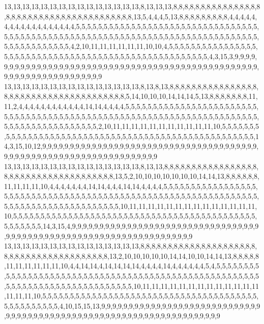 13,13,13,13,13,13,13,13,13,13,13,13,13,13,13,8,13,13,13,8,8,8,8,8,8,8,8,8,8,8,8,8,8,8,8,8,8,8,8,8,8,8,8,8,8,8,8,8,8,8,8,8,8,8,8,8,8,8,13,5,4,4,4,5,13,8,8,8,8,8,8,8,8,8,4,4,4,4,4,4,4,4,4,4,4,4,4,4,4,4,4,4,5,5,5,5,5,5,5,5,5,5,5,5,5,5,5,5,5,5,5,5,5,5,5,5,5,5,5,5,5,5,5,5,5,5,5,5,5,5,5,5,5,5,5,5,5,5,5,5,5,5,5,5,5,5,5,5,5,5,5,5,5,5,5,5,5,5,5,5,5,5,5,5,5,5,5,5,5,5,5,5,5,5,5,5,5,5,5,5,5,5,5,4,2,10,11,11,11,11,11,11,10,10,4,5,5,5,5,5,5,5,5,5,5,5,5,5,5,5,5,5,5,5,5,5,5,5,5,5,5,5,5,5,5,5,5,5,5,5,5,5,5,5,5,5,5,5,5,5,5,5,5,5,5,5,5,5,4,3,15,3,9,9,9,9,9,9,9,9,9,9,9,9,9,9,9,9,9,9,9,9,9,9,9,9,9,9,9,9,9,9,9,9,9,9,9,9,9,9,9,9,9,9,9,9,9,9,9,9,9,9,9,9,9,9,9,9,9,9,9,9,9,9,9,9,9,9,9,9
13,13,13,13,13,13,13,13,13,13,13,13,13,13,13,8,13,8,13,8,8,8,8,8,8,8,8,8,8,8,8,8,8,8,8,8,8,8,8,8,8,8,8,8,8,8,8,8,8,8,8,8,8,8,8,8,8,5,14,10,10,10,14,14,14,5,13,8,8,8,8,8,8,8,11,11,2,4,4,4,4,4,4,4,4,4,4,4,4,14,14,4,4,4,4,5,5,5,5,5,5,5,5,5,5,5,5,5,5,5,5,5,5,5,5,5,5,5,5,5,5,5,5,5,5,5,5,5,5,5,5,5,5,5,5,5,5,5,5,5,5,5,5,5,5,5,5,5,5,5,5,5,5,5,5,5,5,5,5,5,5,5,5,5,5,5,5,5,5,5,5,5,5,5,5,5,5,5,5,5,5,5,2,10,11,11,11,11,11,11,11,11,11,11,11,10,5,5,5,5,5,5,5,5,5,5,5,5,5,5,5,5,5,5,5,5,5,5,5,5,5,5,5,5,5,5,5,5,5,5,5,5,5,5,5,5,5,5,5,5,5,5,5,5,5,5,5,5,14,3,15,10,12,9,9,9,9,9,9,9,9,9,9,9,9,9,9,9,9,9,9,9,9,9,9,9,9,9,9,9,9,9,9,9,9,9,9,9,9,9,9,9,9,9,9,9,9,9,9,9,9,9,9,9,9,9,9,9,9,9,9,9,9,9,9,9,9,9,9,9
13,13,13,13,13,13,13,13,13,13,13,13,13,13,13,8,13,13,8,8,8,8,8,8,8,8,8,8,8,8,8,8,8,8,8,8,8,8,8,8,8,8,8,8,8,8,8,8,8,8,8,8,8,8,8,13,5,2,10,10,10,10,10,10,10,14,14,13,8,8,8,8,8,8,11,11,11,11,10,4,4,4,4,4,4,4,14,14,4,4,4,14,14,4,4,4,4,5,5,5,5,5,5,5,5,5,5,5,5,5,5,5,5,5,5,5,5,5,5,5,5,5,5,5,5,5,5,5,5,5,5,5,5,5,5,5,5,5,5,5,5,5,5,5,5,5,5,5,5,5,5,5,5,5,5,5,5,5,5,5,5,5,5,5,5,5,5,5,5,5,5,5,5,5,5,5,5,5,5,5,5,10,11,11,11,11,11,11,11,11,11,11,11,11,11,11,10,5,5,5,5,5,5,5,5,5,5,5,5,5,5,5,5,5,5,5,5,5,5,5,5,5,5,5,5,5,5,5,5,5,5,5,5,5,5,5,5,5,5,5,5,5,5,5,5,5,5,5,14,3,15,4,9,9,9,9,9,9,9,9,9,9,9,9,9,9,9,9,9,9,9,9,9,9,9,9,9,9,9,9,9,9,9,9,9,9,9,9,9,9,9,9,9,9,9,9,9,9,9,9,9,9,9,9,9,9,9,9,9,9,9,9,9,9,9,9,9,9,9,9
13,13,13,13,13,13,13,13,13,13,13,13,13,13,13,8,8,8,8,8,8,8,8,8,8,8,8,8,8,8,8,8,8,8,8,8,8,8,8,8,8,8,8,8,8,8,8,8,8,8,8,8,8,8,8,13,2,10,10,10,10,10,14,14,10,10,14,14,13,8,8,8,8,8,11,11,11,11,11,11,10,4,4,14,14,4,14,14,14,14,4,4,4,4,14,4,4,4,4,4,4,5,4,5,5,5,5,5,5,5,5,5,5,5,5,5,5,5,5,5,5,5,5,5,5,5,5,5,5,5,5,5,5,5,5,5,5,5,5,5,5,5,5,5,5,5,5,5,5,5,5,5,5,5,5,5,5,5,5,5,5,5,5,5,5,5,5,5,5,5,5,5,5,5,5,5,5,5,5,5,10,11,11,11,11,11,11,11,11,11,11,11,11,11,11,11,11,10,5,5,5,5,5,5,5,5,5,5,5,5,5,5,5,5,5,5,5,5,5,5,5,5,5,5,5,5,5,5,5,5,5,5,5,5,5,5,5,5,5,5,5,5,5,5,5,5,5,4,10,15,15,13,9,9,9,9,9,9,9,9,9,9,9,9,9,9,9,9,9,9,9,9,9,9,9,9,9,9,9,9,9,9,9,9,9,9,9,9,9,9,9,9,9,9,9,9,9,9,9,9,9,9,9,9,9,9,9,9,9,9,9,9,9,9,9,9,9,9,9,9
